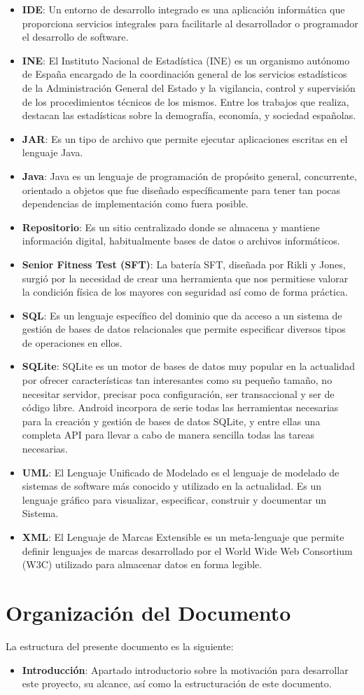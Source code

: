 \begin{itemize}
\item \textbf{IDE}: Un entorno de desarrollo integrado es una aplicación informática que proporciona servicios integrales para facilitarle al desarrollador o programador el desarrollo de software.
\item \textbf{INE}: El Instituto Nacional de Estadística (INE) es un organismo autónomo de España encargado de la coordinación general de los servicios estadísticos de la Administración General del Estado y la vigilancia, control y supervisión de los procedimientos técnicos de los mismos. Entre los trabajos que realiza, destacan las estadísticas sobre la demografía, economía, y sociedad españolas.
\item \textbf{JAR}: Es un tipo de archivo que permite ejecutar aplicaciones escritas en el lenguaje Java.
\item \textbf{Java}: Java es un lenguaje de programación de propósito general, concurrente, orientado a objetos que fue diseñado específicamente para tener tan pocas dependencias de implementación como fuera posible.
\item \textbf{Repositorio}: Es un sitio centralizado donde se almacena y mantiene información digital, habitualmente bases de datos o archivos informáticos.
\item \textbf{Senior Fitness Test (SFT)}: La batería SFT, diseñada por Rikli y Jones, surgió por la necesidad de crear una herramienta que nos permitiese valorar la condición física de los mayores con seguridad así como de forma práctica.
\item \textbf{SQL}: Es un lenguaje específico del dominio que da acceso a un sistema de gestión de bases de datos relacionales que permite especificar diversos tipos de operaciones en ellos.
\item \textbf{SQLite}: SQLite es un motor de bases de datos muy popular en la actualidad por ofrecer características tan interesantes como su pequeño tamaño, no necesitar servidor, precisar poca configuración, ser transaccional y ser de código libre. Android incorpora de serie todas las herramientas necesarias para la creación y gestión de bases de datos SQLite, y entre ellas una completa API para llevar a cabo de manera sencilla todas las tareas necesarias.
\item \textbf{UML}: El Lenguaje Unificado de Modelado es el lenguaje de modelado de sistemas de software más conocido y utilizado en la actualidad. Es un lenguaje gráfico para visualizar, especificar, construir y documentar un Sistema.
\item \textbf{XML}: El Lenguaje de Marcas Extensible es un meta-lenguaje que permite definir lenguajes de marcas desarrollado por el World Wide Web Consortium (W3C) utilizado para almacenar datos en forma legible.
\end{itemize}

\section{Organización del Documento}

La estructura del presente documento es la siguiente:

\begin{itemize}
\item \textbf{Introducción}: Apartado introductorio sobre la motivación para desarrollar este proyecto, su alcance, así como la estructuración de este documento.
\end{itemize}

